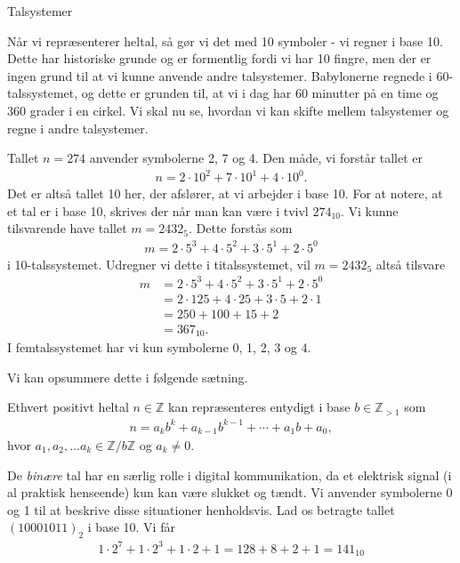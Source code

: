
\begin{center}
	\Huge
	Talsystemer
\end{center}
Når vi repræsenterer heltal, så gør vi det med 10 symboler - vi regner i base 10. Dette har historiske grunde og er formentlig fordi vi har 10 fingre, men der er ingen grund til at vi kunne anvende andre talsystemer. Babylonerne regnede i 60-talssystemet, og dette er grunden til, at vi i dag har 60 minutter på en time og 360 grader i en cirkel. Vi skal nu se, hvordan vi kan skifte mellem talsystemer og regne i andre talsystemer. 

\begin{exa}
	Tallet $n = 274$ anvender symbolerne 2, 7 og 4. Den måde, vi forstår tallet er
	\begin{align*}
		n = 2\cdot 10^2 + 7\cdot 10^1 + 4\cdot 10^0.
	\end{align*}
	Det er altså tallet 10 her, der afslører, at vi arbejder i base 10. 
	For at notere, at et tal er i base 10, skrives der når man kan være i tvivl $274_{10}$.
	Vi kunne tilsvarende have tallet $m = 2432_{5}$. Dette forstås som
	\begin{align*}
		m = 2\cdot 5^3 + 4\cdot 5^2 + 3\cdot 5^1 + 2\cdot 5^0
	\end{align*}
	i 10-talssystemet. Udregner vi dette i titalssystemet, vil $m = 2432_{5}$ altså tilsvare
	\begin{align*}
		m &= 2\cdot 5^3 + 4\cdot 5^2 + 3\cdot 5^1 + 2\cdot 5^0 \\
		  &= 2\cdot 125 + 4\cdot 25 + 3\cdot 5 + 2\cdot 1 \\ 
		  &= 250 + 100 + 15 + 2 \\
		  &= 367_{10}.
	\end{align*}
	I femtalssystemet har vi kun symbolerne 0, 1, 2, 3 og 4.
\end{exa}

Vi kan opsummere dette i følgende sætning.
\begin{setn}
	Ethvert positivt heltal $n\in \mathbb{Z}$ kan repræsenteres entydigt i base $b\in \mathbb{Z}_{>1}$ som
	\begin{align*}
		n = a_k b^k + a_{k-1}b^{k-1} + \cdots + a_1 b + a_0,
	\end{align*}
	hvor $a_1, a_2, \hdots a_k \in \mathbb{Z}/b\mathbb{Z}$ og $a_k \neq 0$. 
\end{setn}

\begin{exa}
	De \textit{binære} tal har en særlig rolle i digital kommunikation, da et elektrisk signal (i al praktisk henseende)
	 kun kan være slukket og tændt. Vi anvender symbolerne 0 og 1 til at beskrive disse situationer henholdsvis. Lad os
	 betragte tallet $(10001011)_{2}$ i base 10. Vi får
	 \begin{align*}
	 	1\cdot 2^7 + 1\cdot 2^3 + 1\cdot 2 + 1 = 128 + 8 + 2 + 1 = 141_{10}
	 \end{align*}
\end{exa}

